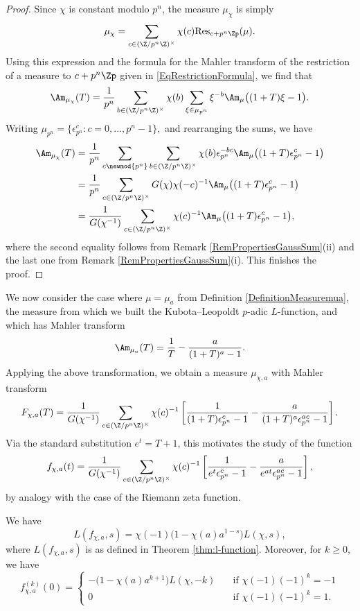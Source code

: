 \documentclass[a4paper,10pt, english, reqno]{smfart}
\numberwithin{equation}{section}
\begin{document}
\begin{proof}
Since $\chi$ is constant modulo $p^n$, the measure $\mu_{\chi}$ is simply
\[\mu_{\chi} = \sum_{c\in(\Z/p^n \Z)^\times} \chi(c)\mathrm{Res}_{c+p^n\Zp}(\mu).\]
Using this expression and the formula for the Mahler transform of the restriction of a measure to $c + p^n\Zp$ given in \eqref{EqRestrictionFormula}, we find that
\[\Am_{\mu_{\chi}}(T) = \frac{1}{p^n}\sum_{b\in (\Z/p^n \Z)^\times}\chi(b)\sum_{\xi\in\mu_{p^n}}\xi^{-b}\Am_{\mu}\big( (1+T)\xi - 1 \big).\]
Writing $\mu_{p^n} = \{\epsilon_{p^n}^c : c = 0,...,p^n -1\},$ and rearranging the sums, we have
\begin{align*}
\Am_{\mu_{\chi}}(T) &= \frac{1}{p^n}\sum_{c\newmod{p^n}}\sum_{b\in (\Z/p^n \Z)^\times}\chi(b)\epsilon_{p^n}^{-bc}\Am_{\mu}\big( (1+T)\epsilon_{p^n}^c - 1\big) \\
&= \frac{1}{p^n}\sum_{c\in(\Z/p^n \Z)^\times} G(\chi) \chi(-c)^{-1} \Am_{\mu} \big( (1+T)\epsilon_{p^n}^c - 1\big) \\
&= \frac{1}{G(\chi^{-1})} \sum_{c\in(\Z/p^n \Z)^\times} \chi(c)^{-1} \Am_{\mu} \big( (1+T)\epsilon_{p^n}^c - 1\big),
\end{align*}
where the second equality follows from Remark \ref{RemPropertiesGaussSum}(ii) and the last one from Remark \ref{RemPropertiesGaussSum}(i). This finishes the proof.
\end{proof}

We now consider the case where $\mu = \mu_a$ from Definition \ref{DefinitionMeasuremua}, the measure from which we built the Kubota--Leopoldt $p$-adic $L$-function, and which has Mahler transform
\[\Am_{\mu_a}(T) = \frac{1}{T} - \frac{a}{(1+T)^a - 1}.\]
Applying the above transformation, we obtain a measure $\mu_{\chi,a}$ with Mahler transform
\[F_{\chi,a}(T) = \frac{1}{G(\chi^{-1})}\sum_{c \in (\Z/p^n \Z)^\times} \chi(c)^{-1}\left[\frac{1}{(1+T)\epsilon_{p^n}^c - 1} - \frac{a}{(1+T)^a\epsilon_{p^n}^{ac} - 1}\right].\]
Via the standard substitution $e^t = T+1$, this motivates the study of the function 
\[f_{\chi,a}(t) = \frac{1}{G(\chi^{-1})}\sum_{c \in (\Z/p^n \Z)^\times} \chi(c)^{-1}\left[\frac{1}{e^t\epsilon_{p^n}^c - 1} - \frac{a}{e^{at}\epsilon_{p^n}^{ac} - 1}\right],\]
by analogy with the case of the Riemann zeta function.

\begin{lemma}\label{lem:dirichlet integral}
We have
\[L(f_{\chi,a},s) = \chi(-1)\big(1-\chi(a)a^{1-s}\big)L(\chi,s),\]
where $L(f_{\chi,a},s)$ is as defined in Theorem \ref{thm:l-function}. Moreover, for $k \geq 0$, we have
\[
f_{\chi,a}^{(k)}(0) =   \begin{cases}
           -\big(1-\chi(a)a^{k+1}\big)L(\chi,-k) & \quad \text{if } \chi(-1) (-1)^k = -1 \\
    0  & \quad \text{if } \chi(-1) (-1)^k = 1.
  \end{cases}
\]
\end{lemma}
\end{document}
